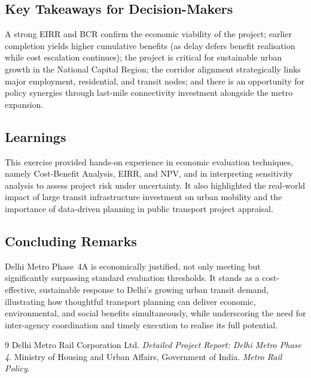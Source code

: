 \documentclass[11pt]{article}
\begin{document}
\subsection{Key Takeaways for Decision-Makers}
A strong EIRR and BCR confirm the economic viability of the project; earlier completion yields higher
cumulative benefits (as delay defers benefit realisation while cost escalation continues); the project
is critical for sustainable urban growth in the National Capital Region; the corridor alignment
strategically links major employment, residential, and transit nodes; and there is an opportunity for
policy synergies through last-mile connectivity investment alongside the metro expansion.

\subsection{Learnings}
This exercise provided hands-on experience in economic evaluation techniques, namely Cost-Benefit
Analysis, EIRR, and NPV, and in interpreting sensitivity analysis to assess project risk under
uncertainty. It
also highlighted the real-world impact of large transit infrastructure investment on urban mobility
and the importance of data-driven planning in public transport project appraisal.

\subsection{Concluding Remarks}
Delhi Metro Phase~4A is economically justified, not only meeting but significantly surpassing standard
evaluation thresholds. It stands as a cost-effective, sustainable response to Delhi's growing urban
transit demand, illustrating how thoughtful transport planning can deliver economic, environmental, and
social benefits simultaneously, while underscoring the need for inter-agency coordination and timely
execution to realise its full potential.

\begin{thebibliography}{9}
 Delhi Metro Rail Corporation Ltd. \textit{Detailed Project Report: Delhi Metro Phase 4}.
 Ministry of Housing and Urban Affairs, Government of India. \textit{Metro Rail Policy}.
\end{thebibliography}
\end{document}
